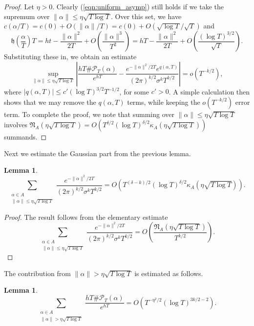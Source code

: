 \documentclass[11pt]{amsart}
\newtheorem{lemma}[theorem]{Lemma}%
\theoremstyle{definition}
\numberwithin{equation}{section}
\numberwithin{theorem}{section}
\begin{document}
\begin{proof}
Let $\eta>0$. Clearly (\ref{eqn:uniform_asymp}) still holds if we take the supremum over
$\|\alpha\| \le \eta\sqrt{T\log T}$. Over this set, we have
$c(\alpha/T) = c(0) + O(\|\alpha\|/T) = c(0) + O(\sqrt{\log T}/\sqrt{T})$
and
\[
\mathfrak h\left(\frac{\alpha}{T}\right)T = ht -\frac{\|\alpha\|^2}{2T} + O\left(\frac{\|\alpha\|^3}{T^2}\right)
= hT -\frac{\|\alpha\|^2}{2T}  +O\left(\frac{(\log T)^{3/2}}{\sqrt T}\right).
\]
Substituting these in, we obtain an estimate
\[
\sup_{\|\alpha\| \le \eta \sqrt{T \log T}}
\left|\frac{hT\#\mathscr P_T(\alpha)}{e^{hT}} - 
\frac{e^{-\|\alpha\|^2/2T} e^{q(\alpha,T)}}{(2\pi)^{k/2} \sigma^k T^{k/2}}\right| = o(T^{-k/2}),
\]
where $|q(\alpha, T)| \le c'(\log T)^{3/2} T^{-1/2}$, for some $c'>0$.
A simple calculation then shows that we may remove the $q(\alpha,T)$ terms, while keeping the
$o(T^{-k/2})$ error term.
To complete the proof, we note that summing over $\|\alpha\|\le \eta \sqrt{T\log T}$
involves $\mathfrak N_A(\eta \sqrt{T \log T}) = O(T^{\delta/2} (\log T)^{\delta/2} 
\kappa_A(\eta \sqrt{T\log T}))$ summands.
\end{proof}

Next we estimate the Gaussian part from the previous lemma.

\begin{lemma}\label{lem:estimate_gaussian}
\[
\sum_{\substack{\alpha \in A \\ \|\alpha\|\le \eta\sqrt{T\log T}}}
\frac{e^{-\|\alpha\|^2/2T}}{(2\pi)^{k/2} \sigma^k T^{k/2}}
=O(T^{(\delta-k)/2} (\log T)^{\delta/2} \kappa_A(\eta\sqrt{T \log T})).
\]
\end{lemma}

\begin{proof}
The result follows from the elementary estimate
\[
\sum_{\substack{\alpha \in A \\ \|\alpha\|\le \eta\sqrt{T\log T}}}
\frac{e^{-\|\alpha\|^2/2T}}{(2\pi)^{k/2} \sigma^k T^{k/2}}
=O\left(\frac{\mathfrak N_A(\eta\sqrt{T \log T})}{T^{k/2}}\right).
\]
\end{proof}

The contribution from $\|\alpha\|>\eta\sqrt{T\log T}$ is estimated as follows.

\begin{lemma}\label{lem:large_terms}
\[
\sum_{\substack{\alpha \in A \\ \|\alpha\|>\eta\sqrt{T\log T}}}
\frac{hT\#\mathscr P_T(\alpha)}{e^{hT}} 
=O(T^{-\eta^2/2} (\log T)^{3k/2 -2}).
\]
\end{lemma}
\end{document}
